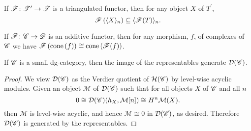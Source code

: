 \documentclass[dissertation.tex]{subfiles}
\begin{document}
\begin{lem}\label{TriangulatedFunctorsPreserveGens}
  If $\mathscr{F} \colon \mathscr{T}^\prime \to \mathscr{T}$ is a triangulated functor, then for any object $X$ of $T^\prime$, 
  $$\mathscr{F}\left(\langle X \rangle_n\right) \subseteq \langle \mathscr{F}(T) \rangle_n.$$
\end{lem}

\begin{lem}\label{AdditiveFunctorsCommuteWithCones}
  If $\mathscr{F} \colon \mathscr{C} \rightarrow \mathscr{D}$ is an additive functor, then for any morphism, $f$, of complexes of $\mathscr{C}$ we have
  $\mathscr{F}\left(\operatorname{cone}\left(f\right)\right) \cong \operatorname{cone}\left(\mathscr{F}(f)\right)$.
\end{lem}

\begin{lem}\label{RepresentablesGenerateSmallDG}
  If $\mathscr{C}$ is a small dg-category, then the image of the representables generate $\mathcal{D}(\mathscr{C})$.

  \begin{proof}
    We view $\mathcal{D}(\mathscr{C})$ as the Verdier quotient of $\mathcal{H}(\mathscr{C})$ by level-wise acyclic modules.
    Given an object $\mathcal{M}$ of $\mathcal{D}(\mathscr{C})$ such that for all objects $X$ of $\mathscr{C}$ and all $n$
    $$0 \cong \mathcal{D}(\mathscr{C})(h_X, \mathcal{M}[n]) \cong H^n\mathcal{M}(X).$$
    then $\mathcal{M}$ is level-wise acyclic, and hence $\mathcal{M} \cong 0$ in $\mathcal{D}(\mathscr{C})$, as desired.
    Therefore $\mathcal{D}(\mathscr{C})$ is generated by the representables.
  \end{proof}
\end{lem}
\end{document}
